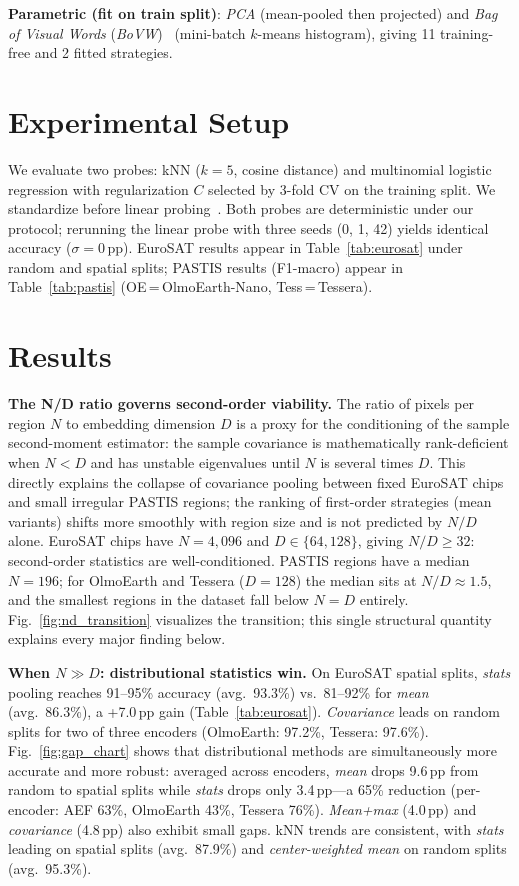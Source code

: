 \documentclass[journal]{IEEEtran}
\begin{document}
\textbf{Parametric (fit on train split)}: \textit{PCA} (mean-pooled then projected) and \textit{Bag of Visual Words} (\textit{BoVW})~\cite{csurka2004visual} (mini-batch $k$-means histogram), giving 11 training-free and 2 fitted strategies.

\section{Experimental Setup}
We evaluate two probes: kNN ($k{=}5$, cosine distance) and multinomial logistic regression with regularization $C$ selected by 3-fold CV on the training split. We standardize before linear probing~\cite{corley2024revisiting}. Both probes are deterministic under our protocol; rerunning the linear probe with three seeds (0, 1, 42) yields identical accuracy ($\sigma{=}0$\,pp). EuroSAT results appear in Table~\ref{tab:eurosat} under random and spatial splits; PASTIS results (F1-macro) appear in Table~\ref{tab:pastis} (OE\,=\,OlmoEarth-Nano, Tess\,=\,Tessera).




\section{Results}
\label{sec:results}

\textbf{The N/D ratio governs second-order viability.} The ratio of pixels per region $N$ to embedding dimension $D$ is a proxy for the conditioning of the sample second-moment estimator: the sample covariance is mathematically rank-deficient when $N < D$ and has unstable eigenvalues until $N$ is several times $D$. This directly explains the collapse of covariance pooling between fixed EuroSAT chips and small irregular PASTIS regions; the ranking of first-order strategies (mean variants) shifts more smoothly with region size and is not predicted by $N/D$ alone. EuroSAT chips have $N{=}4{,}096$ and $D{\in}\{64,128\}$, giving $N/D \geq 32$: second-order statistics are well-conditioned. PASTIS regions have a median $N{=}196$; for OlmoEarth and Tessera ($D{=}128$) the median sits at $N/D{\approx}1.5$, and the smallest regions in the dataset fall below $N{=}D$ entirely. Fig.~\ref{fig:nd_transition} visualizes the transition; this single structural quantity explains every major finding below.

\textbf{When $N \gg D$: distributional statistics win.} On EuroSAT spatial splits, \textit{stats} pooling reaches 91--95\% accuracy (avg.\ 93.3\%) vs.\ 81--92\% for \textit{mean} (avg.\ 86.3\%), a +7.0\,pp gain (Table~\ref{tab:eurosat}). \textit{Covariance} leads on random splits for two of three encoders (OlmoEarth: 97.2\%, Tessera: 97.6\%). Fig.~\ref{fig:gap_chart} shows that distributional methods are simultaneously more accurate and more robust: averaged across encoders, \textit{mean} drops 9.6\,pp from random to spatial splits while \textit{stats} drops only 3.4\,pp---a 65\% reduction (per-encoder: AEF 63\%, OlmoEarth 43\%, Tessera 76\%). \textit{Mean+max} (4.0\,pp) and \textit{covariance} (4.8\,pp) also exhibit small gaps. kNN trends are consistent, with \textit{stats} leading on spatial splits (avg.\ 87.9\%) and \textit{center-weighted mean} on random splits (avg.\ 95.3\%).
\end{document}

